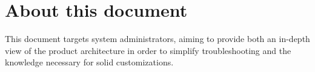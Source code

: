 \section{About this document}
    This document targets system administrators, aiming to provide both an in-depth view of the product architecture in
    order to simplify troubleshooting and the knowledge necessary for solid customizations.
